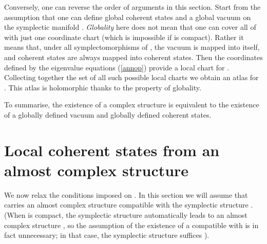 \documentclass[a4paper,a4paper]{article}
\begin{document}
Conversely, one can reverse the order of arguments in this section. 
Start from the assumption that one can define global coherent states 
\coordHE{} and a global vacuum \myHighlight{$|0\rangle$}\coordHE{} on the symplectic manifold \coordHE{}.
{\it Globality}\/ here does not mean that one can cover all of \coordHE{} 
with just one coordinate chart (which is impossible if \coordHE{} is compact).
Rather it means that, under all
symplectomorphisms of \coordHE{}, the vacuum is mapped into itself, 
and coherent states are always mapped into coherent states. 
Then the coordinates \coordHE{} defined by the eigenvalue equations 
(\ref{annop}) provide a local chart for \coordHE{}. Collecting together the set of all 
such possible local charts we obtain an atlas for \coordHE{}. This atlas is holomorphic 
thanks to the property of globality.

To summarise, the existence of a complex structure \coordHE{} 
is equivalent to the existence of a globally defined vacuum and globally 
defined coherent states.

\section{Local coherent states from an almost complex structure}\label{loccoh}

We now relax the conditions imposed on \coordHE{}. In this section we will assume
that \coordHE{} carries an almost complex structure \coordHE{} compatible with 
the symplectic structure \coordHE{}. (When \coordHE{} is compact, 
the symplectic structure \coordHE{} automatically leads to an almost complex 
structure \coordHE{}, so the assumption of the existence of a \coordHE{}
compatible with \coordHE{} is in fact unnecessary; in that case, the 
symplectic structure \coordHE{} suffices \cite{MCDUFF}). 
\end{document}
